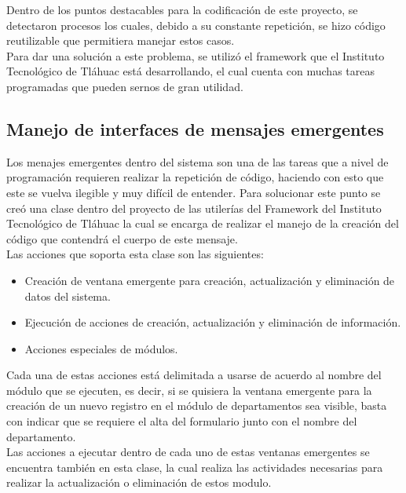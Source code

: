 		Dentro de los puntos destacables para la codificaci\'on de este proyecto, se detectaron procesos los cuales, debido a su constante repetici\'on, se hizo c\'odigo reutilizable que permitiera manejar estos casos.\\
		
		Para dar una soluci\'on a este problema, se utiliz\'o el framework que el Instituto Tecnol\'ogico de Tláhuac está desarrollando, el cual cuenta con muchas tareas programadas que pueden sernos de gran utilidad.\\

		\subsection{Manejo de interfaces de mensajes emergentes}

			Los menajes emergentes dentro del sistema son una de las tareas que a nivel de programaci\'on requieren realizar la repetici\'on de c\'odigo, haciendo con esto que este se vuelva ilegible y muy dif\'icil de entender. Para solucionar este punto se cre\'o una clase dentro del proyecto de las utiler\'ias del Framework del Instituto Tecnol\'ogico de Tl\'ahuac la cual se encarga de realizar el manejo de la creaci\'on del c\'odigo que contendr\'a el cuerpo de este mensaje.\\

			Las acciones que soporta esta clase son las siguientes:
			\begin{itemize}
				\item Creaci\'on de ventana emergente para creaci\'on, actualizaci\'on y eliminaci\'on de datos del sistema.
				\item Ejecuci\'on de acciones de creaci\'on, actualizaci\'on y eliminaci\'on de informaci\'on.
				\item Acciones especiales de m\'odulos.
			\end{itemize}

			Cada una de estas acciones est\'a delimitada a usarse de acuerdo al nombre del m\'odulo que se ejecuten, es decir, si se quisiera la ventana emergente para la creaci\'on de un nuevo registro en el m\'odulo de departamentos sea visible, basta con indicar que se requiere el alta del formulario junto con el nombre del departamento.\\

			Las acciones a ejecutar dentro de cada uno de estas ventanas emergentes se encuentra tambi\'en en esta clase, la cual realiza las actividades necesarias para realizar la actualizaci\'on o eliminaci\'on de estos modulo.


